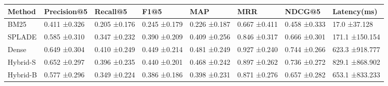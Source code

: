 \begin{tabular}{llllllll}
\toprule
Method & Precision@5 & Recall@5 & F1@5 & MAP & MRR & NDCG@5 & Latency(ms) \\
\midrule
BM25 & 0.411 ±0.326 & 0.205 ±0.176 & 0.245 ±0.179 & 0.226 ±0.187 & 0.667 ±0.411 & 0.458 ±0.333 & 17.0 ±37.128 \\
SPLADE & 0.585 ±0.310 & 0.347 ±0.232 & 0.390 ±0.209 & 0.409 ±0.256 & 0.846 ±0.317 & 0.666 ±0.301 & 171.1 ±150.154 \\
Dense & 0.649 ±0.304 & 0.410 ±0.249 & 0.449 ±0.214 & 0.481 ±0.249 & 0.927 ±0.240 & 0.744 ±0.266 & 623.3 ±918.777 \\
Hybrid-S & 0.652 ±0.297 & 0.396 ±0.235 & 0.440 ±0.201 & 0.468 ±0.242 & 0.897 ±0.262 & 0.736 ±0.272 & 829.1 ±868.902 \\
Hybrid-B & 0.577 ±0.296 & 0.349 ±0.224 & 0.386 ±0.186 & 0.398 ±0.231 & 0.871 ±0.276 & 0.657 ±0.282 & 653.1 ±833.233 \\
\bottomrule
\end{tabular}

